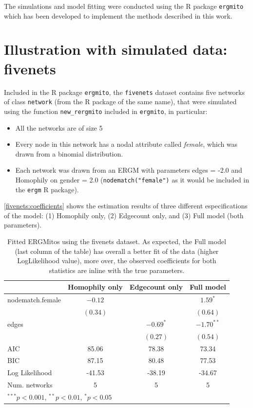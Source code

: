 \documentclass[12pt]{article}
\begin{document}
The simulations and model fitting were conducted using the R package \texttt{ergmito} which has been developed to implement the methods described in this work.

\section{Illustration with simulated data: fivenets}

Included in the R package \texttt{ergmito}, the \texttt{fivenets} dataset contains five networks of class \texttt{network} (from the R package of the same name), that were simulated using the function \texttt{new\_rergmito} included in \texttt{ergmito}, in particular:

\begin{itemize}
    \item All the networks are of size 5
    \item Every node in this network has a nodal attribute called \emph{female}, which was drawn from a binomial distribution.
    \item Each network was drawn from an ERGM with parameters
    edges = -2.0 and Homophily on gender = 2.0 (\texttt{nodematch("female")} as it would be included in the \texttt{ergm} R package).
\end{itemize}

\autoref{fivenets:coefficients} shows the estimation results of three different especifications of the model: (1) Homophily only, (2) Edgecount only, and (3) Full model (both parameters).

\begin{table}
\begin{center}
\begin{tabular}{l c c c }
\hline
 & Homophily only & Edgecount only & Full model \\
\hline
nodematch.female & $-0.12$  &             & $1.59^{*}$   \\
                 & $(0.34)$ &             & $(0.64)$     \\
edges            &          & $-0.69^{*}$ & $-1.70^{**}$ \\
                 &          & $(0.27)$    & $(0.54)$     \\
\hline
AIC              & 85.06    & 78.38       & 73.34        \\
BIC              & 87.15    & 80.48       & 77.53        \\
Log Likelihood   & -41.53   & -38.19      & -34.67       \\
Num. networks    & 5        & 5           & 5            \\
\hline
\multicolumn{4}{l}{\scriptsize{$^{***}p<0.001$, $^{**}p<0.01$, $^*p<0.05$}}
\end{tabular}
\caption{Fitted ERGMitos using the fivenets dataset. As expected, the Full model (last column of the table) has overall a better fit of the data (higher LogLikelihood value), more over, the observed coefficients for both statistics are inline with the true parameters.}
\label{fivenets:coefficients}
\end{center}
\end{table}
\end{document}
